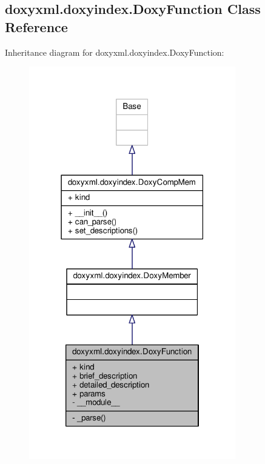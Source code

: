 \subsection{doxyxml.\+doxyindex.\+Doxy\+Function Class Reference}
\label{classdoxyxml_1_1doxyindex_1_1DoxyFunction}


Inheritance diagram for doxyxml.\+doxyindex.\+Doxy\+Function\+:
\nopagebreak
\begin{figure}[H]
\begin{center}
\leavevmode
\includegraphics[width=255pt]{d2/d65/classdoxyxml_1_1doxyindex_1_1DoxyFunction__inherit__graph}
\end{center}
\end{figure}


